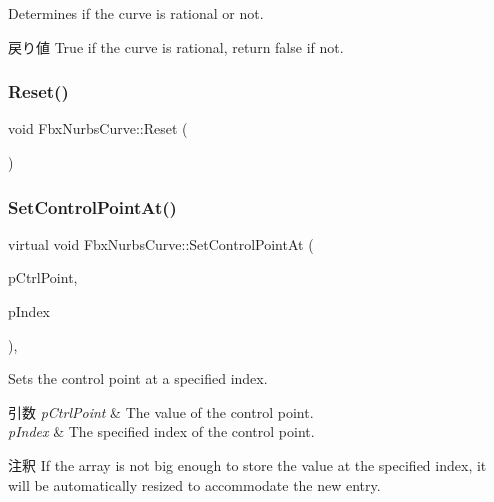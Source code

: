 Determines if the curve is rational or not. \begin{DoxyReturn}{戻り値}
{\ttfamily True} if the curve is rational, return {\ttfamily false} if not. 
\end{DoxyReturn}
\mbox{\label{class_fbx_nurbs_curve_ab65486c99f52b9c319583f43f14226bb}} 
\subsubsection{\texorpdfstring{Reset()}{Reset()}}
{\footnotesize\ttfamily void Fbx\+Nurbs\+Curve\+::\+Reset (\begin{DoxyParamCaption}{ }\end{DoxyParamCaption})\hspace{0.3cm}{\ttfamily [protected]}}

\mbox{\label{class_fbx_nurbs_curve_a7313bcfe1a7b6d566f30e5395bf89877}} 
\subsubsection{\texorpdfstring{Set\+Control\+Point\+At()}{SetControlPointAt()}}
{\footnotesize\ttfamily virtual void Fbx\+Nurbs\+Curve\+::\+Set\+Control\+Point\+At (\begin{DoxyParamCaption}\item[{const \hyperlink{class_fbx_vector4}{Fbx\+Vector4} \&}]{p\+Ctrl\+Point,  }\item[{int}]{p\+Index }\end{DoxyParamCaption})\hspace{0.3cm}{\ttfamily [inline]}, {\ttfamily [virtual]}}

Sets the control point at a specified index. 
\begin{DoxyParams}{引数}
{\em p\+Ctrl\+Point} & The value of the control point. \\
\hline
{\em p\+Index} & The specified index of the control point.\\
\hline
\end{DoxyParams}
\begin{DoxyRemark}{注釈}
If the array is not big enough to store the value at the specified index, it will be automatically resized to accommodate the new entry. 
\end{DoxyRemark}


